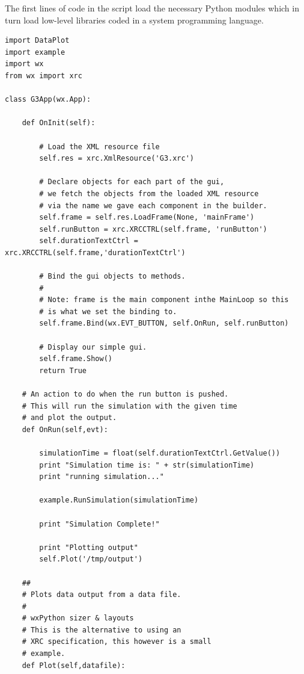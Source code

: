 \documentclass[10pt]{article}
\begin{document}
The first lines of code in the script load the necessary Python
modules which in turn load low-level libraries coded in a system
programming language. %

\begin{verbatim}
import DataPlot
import example
import wx
from wx import xrc

class G3App(wx.App):

    def OnInit(self):

        # Load the XML resource file
        self.res = xrc.XmlResource('G3.xrc')

        # Declare objects for each part of the gui,
        # we fetch the objects from the loaded XML resource
        # via the name we gave each component in the builder.
        self.frame = self.res.LoadFrame(None, 'mainFrame')
        self.runButton = xrc.XRCCTRL(self.frame, 'runButton')
        self.durationTextCtrl = xrc.XRCCTRL(self.frame,'durationTextCtrl')

        # Bind the gui objects to methods.
        #
        # Note: frame is the main component inthe MainLoop so this
        # is what we set the binding to. 
        self.frame.Bind(wx.EVT_BUTTON, self.OnRun, self.runButton)

        # Display our simple gui.
        self.frame.Show()
        return True       

    # An action to do when the run button is pushed.
    # This will run the simulation with the given time
    # and plot the output.
    def OnRun(self,evt):

        simulationTime = float(self.durationTextCtrl.GetValue())
        print "Simulation time is: " + str(simulationTime)
        print "running simulation..."

        example.RunSimulation(simulationTime)

        print "Simulation Complete!"

        print "Plotting output"
        self.Plot('/tmp/output')

    ##
    # Plots data output from a data file.
    #
    # wxPython sizer & layouts
    # This is the alternative to using an
    # XRC specification, this however is a small
    # example.
    def Plot(self,datafile):


\end{verbatim}
\end{document}
